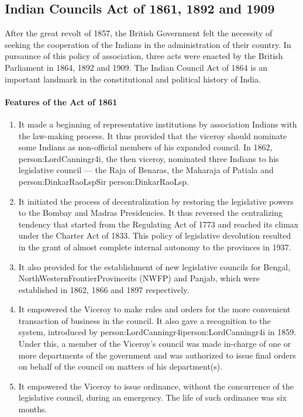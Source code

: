 \subsection{Indian Councils Act of 1861, 1892 and 1909}

After the great revolt of 1857, the British Government felt the necessity of seeking the cooperation of the Indians in the administration of their country. In pursaunce of this policy of association, three acts were enacted by the British Parliament in 1864, 1892 and 1909. The Indian Council Act of 1864 is an important landmark in the constitutional and political history of India.

\paragraph{Features of the Act of 1861}
\begin{enumerate}
  \item It made a beginning of representative institutions by association Indians with the law-making process. It thus provided that the viceroy should nominate some Indians as non-official members of his expanded council. In 1862, \gls{person:LordCanningr4i}, the then viceroy, nominated three Indians to his legislative council — the Raja of Benaras, the Maharaja of Patiala and \gls{person:DinkarRaoLsp}Sir \gls{person:DinkarRaoLsp}.
  \item It initiated the process of decentralization by restoring the legislative powers to the Bombay and Madras Presidencies. It thus reversed the centralizing tendency that started from the Regulating Act of 1773 and reached its climax under the Charter Act of 1833. This policy of legislative devolution resulted in the grant of almost complete internal autonomy to the provinces in 1937.
  \item It also provided for the establishment of new legislative councils for Bengal, \gls{NorthWesternFrontierProvinceits} (NWFP) and Panjab, which were established in 1862, 1866 and 1897 respectively.
  \item It empowered the Viceroy to make rules and orders for the more convenient transaction of business in the council. It also gave a recognition to the   system, introduced by \gls{person:LordCanningr4i}\gls{person:LordCanningr4i} in 1859. Under this, a member of the Viceroy's council was made in-charge of one or more departments of the government and was authorized to issue final orders on behalf of the council on matters of his department(s).
  \item It empowered the Viceroy to issue ordinance, without the concurrence of the legislative council, during an emergency. The life of such ordinance was six months.
\end{enumerate}

